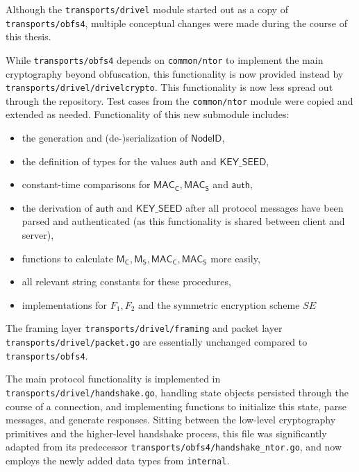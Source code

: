 Although the \texttt{transports/drivel} module started out as a copy of \texttt{transports/obfs4}, multiple conceptual changes were made during the course of this thesis.

While \texttt{transports/obfs4} depends on \texttt{common/ntor} to implement the main cryptography beyond obfuscation, this functionality is now provided instead by \texttt{transports/drivel/drivelcrypto}. This functionality is now less spread out through the repository. Test cases from the \texttt{common/ntor} module were copied and extended as needed.
Functionality of this new submodule includes:
\begin{itemize}
    \item the generation and (de-)serialization of $\mathsf{NodeID}$,
    \item the definition of types for the values $\mathsf{auth}$ and $\mathsf{KEY\_SEED}$,
    \item constant-time comparisons for $\mathsf{MAC_C}, \mathsf{MAC_S}$ and $\mathsf{auth}$,
    \item the derivation of $\mathsf{auth}$ and $\mathsf{KEY\_SEED}$ after all protocol messages have been parsed and authenticated (as this functionality is shared between client and server),
    \item functions to calculate $\mathsf{M_C}, \mathsf{M_S}, \mathsf{MAC_C}, \mathsf{MAC_S}$ more easily,
    \item all relevant string constants for these procedures,
    \item implementations for $F_1, F_2$ and the symmetric encryption scheme $SE$
\end{itemize}

The framing layer \texttt{transports/drivel/framing} and packet layer \texttt{transports/drivel/packet.go} are essentially unchanged compared to \texttt{transports/obfs4}.

The main protocol functionality is implemented in \texttt{transports/drivel/handshake.go}, handling state objects persisted through the course of a connection, and implementing functions to initialize this state, parse messages, and generate responses.
Sitting between the low-level cryptography primitives and the higher-level handshake process, this file was significantly adapted from its predecessor \texttt{transports/obfs4/handshake\_ntor.go}, and now employs the newly added data types from \texttt{internal}.

